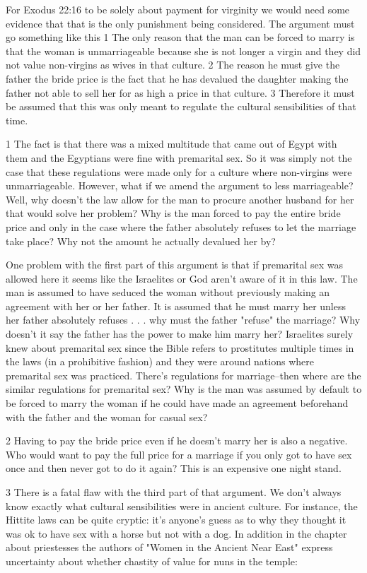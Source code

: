 \documentclass[11pt]{article}
\begin{document}
For Exodus 22:16 to be solely about payment for virginity we would need some evidence that that is the only punishment being considered. The argument must go something like this 
1 The only reason that the man can be forced to marry is that the woman is unmarriageable because she is not longer a virgin and they did not value non-virgins as wives in that culture.
2 The reason he must give the father the bride price is the fact that he has devalued the daughter making the father not able to sell her for as high a price in that culture. 
3 Therefore it must be assumed that this was only meant to regulate the cultural sensibilities of that time.  

1 The fact is that there was a mixed multitude that came out of Egypt with them and the Egyptians were fine with premarital sex. So it was simply not the case that these regulations were made only for a culture where non-virgins were unmarriageable. However, what if we amend the argument to less marriageable? Well, why doesn't the law allow for the man to procure another husband for her that would solve her problem? Why is the man forced to pay the entire bride price and only in the case where the father absolutely refuses to let the marriage take place? Why not the amount he actually devalued her by?

One problem with the first part of this argument is that if premarital sex was allowed here it seems like the Israelites or God aren't aware of it in this law. The man is assumed to have seduced the woman without previously making an agreement with her or her father. It is assumed that he must marry her unless her father absolutely refuses . . . why must the father "refuse" the marriage? Why doesn't it say the father has the power to make him marry her? Israelites surely knew about premarital sex since the Bible refers to prostitutes multiple times in the laws (in a prohibitive fashion) and they were around nations where premarital sex was practiced. There's regulations for marriage--then where are the similar regulations for premarital sex? Why is the man was assumed by default to be forced to marry the woman if he could have made an agreement beforehand with the father and the woman for casual sex?

2 Having to pay the bride price even if he doesn't marry her is also a negative. Who would want to pay the full price for a marriage if you only got to have sex once and then never got to do it again? This is an expensive one night stand.

3 There is a fatal flaw with the third part of that argument. We don't always know exactly what cultural sensibilities were in ancient culture. For instance, the Hittite laws can be quite cryptic: it's anyone's guess as to why they thought it was ok to have sex with a horse but not with a dog.  \cite{hittite beastiality}
In addition in the chapter about priestesses the authors of "Women in the Ancient Near East" express uncertainty about whether chastity of value for nuns in the temple:
\end{document}
